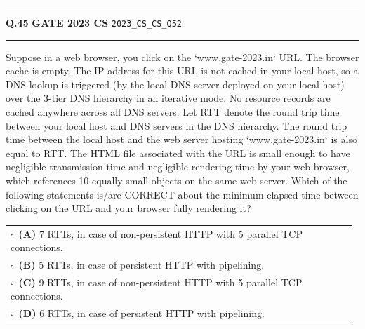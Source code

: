 \documentclass[a4paper,10pt]{article}
\begin{document}
\vspace{6pt}\hrule height 0.35pt\vspace{6pt}
\noindent
\begin{tcolorbox}[
    blanker,
    sidebyside,
    sidebyside align=top,
    lefthand width=0.55\textwidth,
    top=4pt, bottom=4pt, left=0pt, right=0pt,
    middle=16pt,
    underlay={
        \draw[dashed, black!80, line width=0.8pt, dash pattern=on 4pt off 3pt]
            ([xshift=0.55\textwidth+8pt]frame.north west) --
            ([xshift=0.55\textwidth+8pt]frame.south west);
    }
]
\textbf{Q.45}  \hfill {\footnotesize\textbf{GATE 2023 CS} \quad \tiny\texttt{2023\_CS\_CS\_Q52}}
\vspace{2pt}\hrule height 0.3pt\vspace{4pt}

Suppose in a web browser, you click on the `www.gate-2023.in` URL. The browser cache is empty. The IP address for this URL is not cached in your local host, so a DNS lookup is triggered (by the local DNS server deployed on your local host) over the 3-tier DNS hierarchy in an iterative mode. No resource records are cached anywhere across all DNS servers.
Let RTT denote the round trip time between your local host and DNS servers in the DNS hierarchy. The round trip time between the local host and the web server hosting `www.gate-2023.in` is also equal to RTT. The HTML file associated with the URL is small enough to have negligible transmission time and negligible rendering time by your web browser, which references 10 equally small objects on the same web server.
Which of the following statements is/are CORRECT about the minimum elapsed time between clicking on the URL and your browser fully rendering it?

\par\vspace{6pt}\noindent
\begin{tabular}{@{}p{0.98\linewidth}@{}}
$\square$\ \textbf{(A)} 7 RTTs, in case of non-persistent HTTP with 5 parallel TCP connections. \\
\addlinespace[3pt]
$\square$\ \textbf{(B)} 5 RTTs, in case of persistent HTTP with pipelining. \\
\addlinespace[3pt]
$\square$\ \textbf{(C)} 9 RTTs, in case of non-persistent HTTP with 5 parallel TCP connections. \\
\addlinespace[3pt]
$\square$\ \textbf{(D)} 6 RTTs, in case of persistent HTTP with pipelining.
\end{tabular}


\end{tcolorbox}
\end{document}
